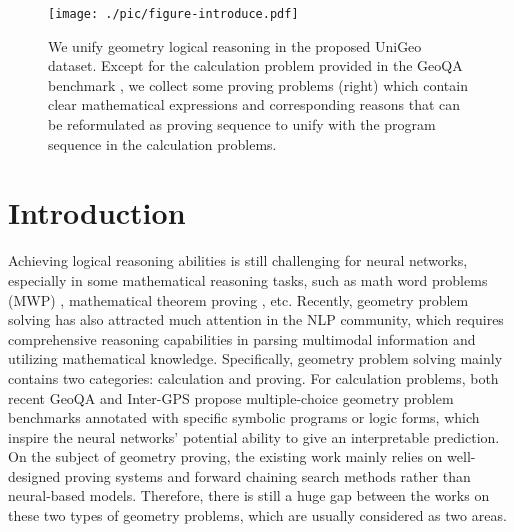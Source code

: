 \documentclass[11pt]{article}
\begin{document}
\begin{figure*}[t]
\begin{center}
 \texttt{[image: ./pic/figure-introduce.pdf]}
 \vspace{-3mm}
\end{center}
  \caption{
  We unify geometry logical reasoning in the proposed UniGeo dataset. Except for the calculation problem provided in the GeoQA benchmark \cite{chen2021geoqa}, we collect some proving problems (right) which contain clear mathematical expressions and corresponding reasons that can be reformulated as proving sequence to unify with the program sequence in the calculation problems.
  }
\label{fig:introduce}
\end{figure*}

\section{Introduction}


Achieving logical reasoning abilities is still challenging for neural networks, especially in some mathematical reasoning tasks, such as math word problems (MWP) \cite{tsrmd,graph2tree,sau-solver,NS-Solver,yang-etal-2022-unbiased,yang2022logicsolver,mishra2022lila,mishra2022numglue,lu2022dynamic}, mathematical theorem proving \cite{li2020isarstep,welleck2021naturalproofs}, etc. 
Recently, geometry problem solving \cite{sachan2020discourse,chen2021geoqa, lu2021inter, ijcai2022p228} has also attracted much attention in the NLP community, which requires comprehensive reasoning capabilities in parsing multimodal information and utilizing mathematical knowledge.
Specifically, geometry problem solving mainly contains two categories: calculation and proving.
For calculation problems, both recent GeoQA \cite{chen2021geoqa} and Inter-GPS \cite{lu2021inter} propose multiple-choice geometry problem benchmarks annotated with specific symbolic programs or logic forms, which inspire the neural networks' potential ability to give an interpretable prediction. 
On the subject of geometry proving, the existing work \cite{chou1996automated,chou2000deductive,gan2019automatically} mainly relies on well-designed proving systems and forward chaining search methods rather than neural-based models.
Therefore, there is still a huge gap between the works on these two types of geometry problems, which are usually considered as two areas.
\end{document}
